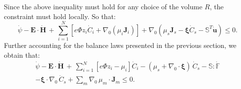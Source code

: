 \documentclass[runningheads]{llncs}
\newcommand{\F}{\ensuremath{\mathbb{F}}}
\begin{document}
Since the above inequality must hold for any choice of the volume $R$, the constraint must hold locally. So that:
\begin{equation}
\dot{\psi} - \mathbf{E}\cdot \dot{\mathbf{H}} \, + \, \sum\limits_{i=1}^{N} \left[e \Phi  z_i \dot{C}_i+ \nabla_0 \left(\mu_i \mathbf{J}_i \right)\right] + \nabla_0 (\mu_s \mathbf{J}_s- \boldsymbol{\xi}\dot{C}_s -\mathbb{S}^T\mathbf{\dot{u}}) \leq 0. 
\end{equation}
Further accounting for the balance laws presented in the previous section, we obtain that:
\begin{equation}
\begin{aligned}
\dot{\psi} - \mathbf{E}\cdot \dot{\mathbf{H}} \, + \, \sum\limits_{i=1}^{N} \left[e \Phi  z_i - \mu_i\right] \dot{C}_i - (\mu_s + \nabla_0 \cdot \boldsymbol{\xi})\,\dot{C}_s -\mathbb{S}:\dot{\F}\\
-\boldsymbol{\xi} \cdot \nabla_0 \, \dot{C}_s + \sum\limits_{m} \nabla_0 \, \mu_m \cdot \mathbf{J}_m \leq 0.
\end{aligned} 
\end{equation}



%
\end{document}

